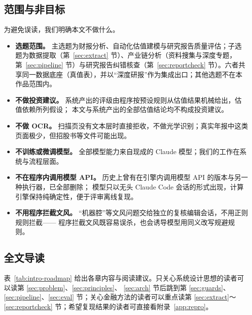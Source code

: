 \subsection{范围与非目标}
\label{sec:intro-scope}

为避免误读，我们明确本文不做什么。
\begin{itemize}
  \item \textbf{选题范围。} 主选题为财报分析、自动化估值建模与研究报告质量评估；子选题为数据提取（第~\ref{sec:extract} 节）、产业链分析（资料搜集与深度专题，第~\ref{sec:pipeline} 节）与研究报告纠错核查（第~\ref{sec:reportcheck} 节）。六者共享同一数据底座（真值表），并以“深度研报”作为集成出口；其他选题不在本作品范围内。
  \item \textbf{不做投资建议。} 系统产出的评级由程序按预设规则从估值结果机械给出，估值依赖所列假设；
        本文与系统产出的全部估值结论均不构成投资建议。
  \item \textbf{不做 OCR。} 扫描页没有文本层时直接拒收，不做光学识别；真实年报中这类页面极少，但招股书等文件可能出现。
  \item \textbf{不训练或微调模型。} 全部模型能力来自现成的 Claude 模型；我们的工作在系统与流程层面。
  \item \textbf{不在程序内调用模型 API。} 历史上曾有在引擎内调用模型 API 的版本与另一种执行器，已全部删除；
        模型只以无头 Claude Code 会话的形式出现，计算引擎保持纯确定性，便于评审离线复现。
  \item \textbf{不用程序拦截文风。} “机器腔”等文风问题交给独立的复核编辑会话，不用正则规则拦截——
        程序拦截文风既容易误杀，也会诱导模型用同义改写规避规则。
\end{itemize}

\subsection{全文导读}
\label{sec:intro-roadmap}

表~\ref{tab:intro-roadmap} 给出各章内容与阅读建议。只关心系统设计思想的读者可以读第 \ref{sec:problem}、\ref{sec:principles}、
\ref{sec:arch} 节后跳到第 \ref{sec:guards}、\ref{sec:pipeline}、\ref{sec:eval} 节；关心金融方法的读者可以重点读第
\ref{sec:extract}～\ref{sec:reportcheck} 节；希望复现结果的读者可直接看附录~\ref{app:repro}。

